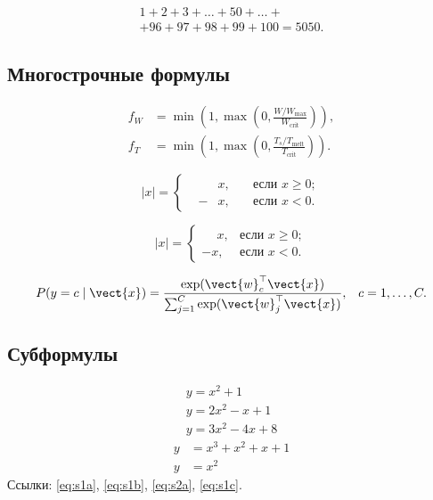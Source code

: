 \documentclass[font=modern]{cmcmsuthesis-bachelor}
\begin{document}
\begin{equation}\label{eq:long}
\begin{multlined}
1+2+3+\dots+50+\dots+\\+96+97+98+99+100=5050.
\end{multlined}
\end{equation}

\subsection{Многострочные формулы}
\[\begin{aligned}
f_W&=\min\!\left(1,\max\!\left(0,\frac{W/W_{\max}}{W_{\text{crit}}}\right)\right),\\
f_T&=\min\!\left(1,\max\!\left(0,\frac{T_s/T_{\text{melt}}}{T_{\text{crit}}}\right)\right).
\end{aligned}\]

\[|x|=\left\{\begin{alignedat}{2}
& &x,\quad&\text{если }x\geqslant 0;\\
&-&x,\quad&\text{если }x<0.
\end{alignedat}\right.\]

\[|x|=\begin{cases}\phantom{-}x,&\text{если }x\geqslant 0;\\-x,&\text{если }x<0.\end{cases}\]

\begin{equation}\label{eq:softmax}
\begin{alignedat}{2}
P(y=c\mid\vect{x})&=\frac{\exp(\vect{w}_c^\top\vect{x})}{\sum_{j=1}^C\exp(\vect{w}_j^\top\vect{x})},&\quad&c=1,\ldots,C.
\end{alignedat}
\end{equation}

\subsection{Субформулы}
\begin{subequations}\label{eq:sub1}
\begin{gather}y=x^2+1\label{eq:s1a}\\y=2x^2-x+1\label{eq:s1b}\\y=3x^2-4x+8\label{eq:s1c}\end{gather}
\end{subequations}
\begin{subequations}\label{eq:sub2}
\begin{align}y&=x^3+x^2+x+1\label{eq:s2a}\\y&=x^2\label{eq:s2b}\end{align}
\end{subequations}
Ссылки: \eqref{eq:s1a}, \eqref{eq:s1b}, \eqref{eq:s2a}, \eqref{eq:s1c}.
\end{document}
